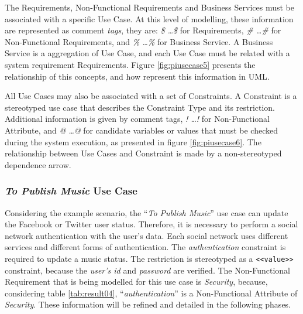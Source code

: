 The {\sc Requirements}, {\sc Non-Functional Requirements} and {\sc Business
Services} must be associated with a specific {\sc Use Case}. At this level of modelling, these information are represented as
comment \textit{tags}, they are: \textit{\$ \ldots \$} for {\sc Requirements},
\textit{\# \ldots \#} for {\sc Non-Functional Requirements}, and \textit{\%
\ldots \%} for {\sc Business Service}. A {\sc
Business Service} is a aggregation of {\sc Use Case}, and each {\sc Use Case}
must be related with a system requirement {\sc Requirements}. Figure
\ref{fig:piusecase5} presents the relationship of this concepts, and how
represent this information in UML.

All {\sc Use Cases} may also be associated with a set of {\sc Constraints}. A
{\sc Constraint} is a stereotyped use case that describes the {\sc Constraint Type} and its
restriction. Additional information is given by comment tags, \textit{!
\ldots !} for {\sc Non-Functional Attribute}, and \textit{@
\ldots @} for candidate variables or values that must be checked during the
system execution, as presented in figure \ref{fig:piusecase6}. The relationship
between {\sc Use Cases} and  {\sc Constraint} is made by a non-stereotyped
dependence arrow.


 
\subsubsection{\textit{To Publish Music} Use Case}

Considering the example scenario, the ``\textit{To Publish Music}'' use case can
update the Facebook or Twitter user status. Therefore, it is necessary to
perform a social network authentication with the user's data. Each social
network uses different services and different forms of authentication. The
\textit{authentication} constraint is required to update a music status. The
restriction is stereotyped as a \texttt{<<value>>} constraint, because the
\textit{user's id} and \textit{password} are verified. The {\sc Non-Functional
Requirement} that is being modelled for this use case is \textit{Security},
because, considering  table \ref{tab:result04}, ``\textit{authentication}'' is
a {\sc Non-Functional Attribute} of \textit{Security}. These information will be
refined and detailed in the following phases.

 
% 



